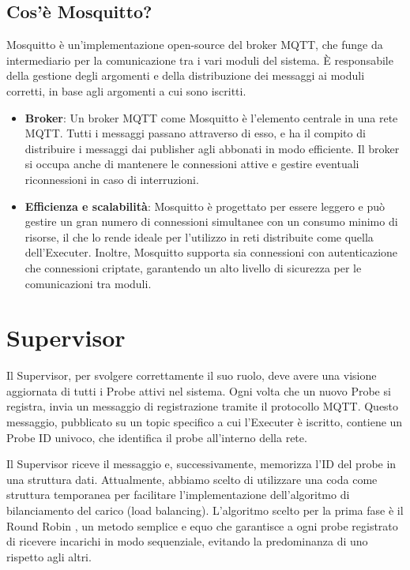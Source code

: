 \documentclass[target=bach,aauheader=,style=]{thud}
\begin{document}
\subsection{Cos'è Mosquitto?}
Mosquitto \cite{mosquitto2024} è un'implementazione open-source del broker MQTT, che funge da intermediario per la comunicazione tra i vari moduli del sistema. È responsabile della gestione degli argomenti e della distribuzione dei messaggi ai moduli corretti, in base agli argomenti a cui sono iscritti.
\begin{itemize}
  \item \textbf{Broker}: Un broker MQTT come Mosquitto è l'elemento centrale in una rete MQTT. Tutti i messaggi passano attraverso di esso, e ha il compito di distribuire i messaggi dai publisher agli abbonati in modo efficiente. Il broker si occupa anche di mantenere le connessioni attive e gestire eventuali riconnessioni in caso di interruzioni.
  \item \textbf{Efficienza e scalabilità}: Mosquitto è progettato per essere leggero e può gestire un gran numero di connessioni simultanee con un consumo minimo di risorse, il che lo rende ideale per l'utilizzo in reti distribuite come quella dell'Executer. Inoltre, Mosquitto supporta sia connessioni con autenticazione che connessioni criptate, garantendo un alto livello di sicurezza per le comunicazioni tra moduli.
\end{itemize}


\section{Supervisor}
Il Supervisor, per svolgere correttamente il suo ruolo, deve avere una visione aggiornata di tutti i Probe attivi nel sistema. Ogni volta che un nuovo Probe si registra, invia un messaggio di registrazione tramite il protocollo MQTT. Questo messaggio, pubblicato su un topic specifico a cui l'Executer è iscritto, contiene un Probe ID univoco, che identifica il probe all'interno della rete.

Il Supervisor riceve il messaggio e, successivamente, memorizza l'ID del probe in una struttura dati. Attualmente, abbiamo scelto di utilizzare una coda come struttura temporanea per facilitare l'implementazione dell'algoritmo di bilanciamento del carico (load balancing). L'algoritmo scelto per la prima fase è il Round Robin , un metodo semplice e equo che garantisce a ogni probe registrato di ricevere incarichi in modo sequenziale, evitando la predominanza di uno rispetto agli altri.
\end{document}
